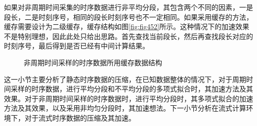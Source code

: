 如果对非周期时间采集的时序数据进行非平均分段，其包含两个不同的因素，一是段长，二是时刻序号，相同的段长时刻序号也不一定相同。如果采用缓存的方法，缓存需要设计为二级缓存，缓存结构如图\ref{fig:fig452}所示。这种情况下的加速效果不是特别理想，因此此处只给出思路。首先查找当前段长，然后再查找段长对应的时刻序号，最后得到是否已经有中间计算结果。

\begin{figure}[htbp]
	\centering                                      %
	\caption{非周期时间采样的时序数据所用缓存数据结构} %
	\label{fig:fig45}                                       %
\end{figure}
这一小节主要分析了静态时序数据的压缩，在已知数据整体的情况下，对于周期时间采样的时序数据，进行平均分段和不平均分段的多项式拟合时，其加速方法及其效果。对于非周期时间采样的时序数据时，进行平均分段时，其多项式拟合的加速方法及其效果，以及采用非均匀分段时，其加速想法。下一小节分析在流式计算环境下，对于流式时序数据的压缩及其加速。

